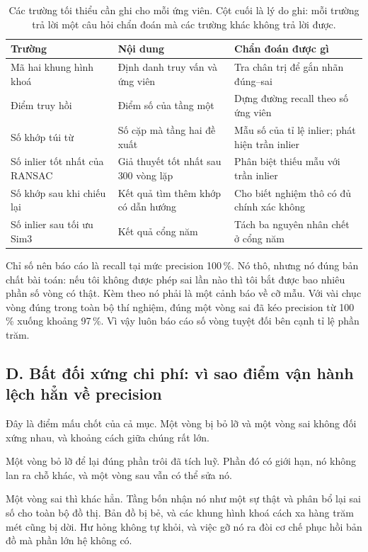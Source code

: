 \documentclass[../../deep_learning.tex]{subfiles}
\begin{document}
\begin{table}[H]\centering\footnotesize
\caption{Các trường tối thiểu cần ghi cho mỗi ứng viên. Cột cuối là lý do ghi: mỗi trường trả lời một câu hỏi chẩn đoán mà các trường khác không trả lời được.}
\label{tab:f29-log}
\begin{tabularx}{\linewidth}{@{}L{4.2cm}YL{5.2cm}@{}}
\toprule
\textbf{Trường} & \textbf{Nội dung} & \textbf{Chẩn đoán được gì}\\
\midrule
Mã hai khung hình khoá & Định danh truy vấn và ứng viên & Tra chân trị để gắn nhãn đúng--sai\\
Điểm truy hồi & Điểm số của tầng một & Dựng đường recall theo số ứng viên\\
Số khớp túi từ & Số cặp mà tầng hai đề xuất & Mẫu số của tỉ lệ inlier; phát hiện trần inlier\\
Số inlier tốt nhất của RANSAC & Giả thuyết tốt nhất sau 300 vòng lặp & Phân biệt thiếu mẫu với trần inlier\\
Số khớp sau khi chiếu lại & Kết quả tìm thêm khớp có dẫn hướng & Cho biết nghiệm thô có đủ chính xác không\\
Số inlier sau tối ưu Sim3 & Kết quả cổng năm & Tách ba nguyên nhân chết ở cổng năm\\
\bottomrule
\end{tabularx}
\end{table}

Chỉ số nên báo cáo là recall tại mức precision 100\,\%. Nó thô, nhưng nó đúng bản chất bài toán: nếu tôi không được phép sai lần nào thì tôi bắt được bao nhiêu phần số vòng có thật. Kèm theo nó phải là một cảnh báo về cỡ mẫu. Với vài chục vòng đúng trong toàn bộ thí nghiệm, đúng một vòng sai đã kéo precision từ 100\,\% xuống khoảng 97\,\%. Vì vậy luôn báo cáo số vòng tuyệt đối bên cạnh tỉ lệ phần trăm.

\subsection{D. Bất đối xứng chi phí: vì sao điểm vận hành lệch hẳn về precision}
Đây là điểm mấu chốt của cả mục. Một vòng bị bỏ lỡ và một vòng sai không đối xứng nhau, và khoảng cách giữa chúng rất lớn.

Một vòng bỏ lỡ để lại đúng phần trôi đã tích luỹ. Phần đó có giới hạn, nó không lan ra chỗ khác, và một vòng sau vẫn có thể sửa nó.

Một vòng sai thì khác hẳn. Tầng bốn nhận nó như một sự thật và phân bổ lại sai số cho toàn bộ đồ thị. Bản đồ bị bẻ, và các khung hình khoá cách xa hàng trăm mét cũng bị dời. Hư hỏng không tự khỏi, và việc gỡ nó ra đòi cơ chế phục hồi bản đồ mà phần lớn hệ không có.
\end{document}
